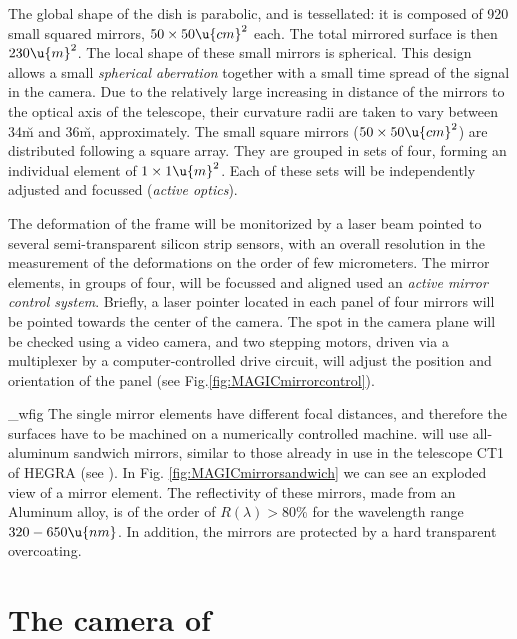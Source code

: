The global shape of the dish is parabolic, and is tessellated: it is
composed of 920 small squared mirrors, $50\times 50 \u{cm}^2$ each.
The total mirrored surface is then $230\u{m}^2$. The local shape of
these small mirrors is spherical. This design allows a small
\emph{spherical aberration} together with a small time spread of the
signal in the camera. Due to the relatively large increasing in
distance of the mirrors to the optical axis of the telescope, their
curvature radii are taken to vary between 34\u{m} and 36\u{m},
approximately.  The small square mirrors ($50\times 50 \u{cm}^2$) are
distributed following a square array. They are grouped in sets of
four, forming an individual element of $1\times 1 \u{m}^2$. Each of
these sets will be independently adjusted and focussed (\emph{active
  optics}).

The deformation of the frame will be monitorized by a laser beam
pointed to several semi-transparent silicon strip sensors, with an
overall resolution in the measurement of the deformations on the order
of few micrometers. The mirror elements, in groups of four, will be
focussed and aligned used an \emph{active mirror control
system}. Briefly, a laser pointer located in each panel of four
mirrors will be pointed towards the center of the camera. The spot in
the camera plane will be checked using a video camera, and two
stepping motors, driven via a multiplexer by a computer-controlled
drive circuit, will adjust the position and orientation of the panel
(see Fig.\ref{fig:MAGICmirrorcontrol}).

\MAGICmirrorcontrol_wfig
%
The single mirror elements have different focal distances, and
therefore the surfaces have to be machined on a numerically controlled
machine. \MAGIC will use all-aluminum sandwich mirrors, similar to
those already in use in the telescope CT1 of HEGRA (see
). In Fig. \ref{fig:MAGICmirrorsandwich} we can
see an exploded view of a mirror element. The reflectivity of these
mirrors, made from an Aluminum alloy, is of the order of $R(\lambda)
> 80\%$ for the wavelength range $320-650\u{nm}$. In addition, the
mirrors are protected by a hard transparent overcoating.

\section{The camera of \MAGIC}
%
